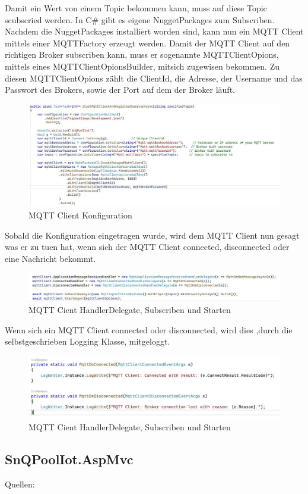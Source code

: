 Damit ein Wert von einem Topic bekommen kann, muss auf diese Topic scubscried werden.
In C\# gibt es eigene NuggetPackages zum Subscriben. Nachdem die NuggetPackages installiert worden sind,
kann nun ein MQTT Client mittels einer MQTTFactory erzeugt werden. Damit der MQTT Client auf den richtigen
Broker subscriben kann, muss er sogenannte MQTTClientOpions, mittels eines MQTTClientOpionsBuilder, mitsich zugewisen bekommen.
Zu diesen MQTTClientOpions zählt die ClientId, die Adresse, der Username und das Passwort des Brokers, sowie
der Port auf dem der Broker läuft.
\begin{figure}[H]
    \centering
    \includegraphics[width=1.3\textwidth]{pics/StartMqttClientConnections.JPG}  
    \caption{MQTT Client Konfiguration}
\end{figure}
Sobald die Konfiguration eingetragen wurde, wird dem MQTT Client nun gesagt was er zu tuen hat, 
wenn sich der MQTT Client connected, disconnected oder eine Nachricht bekommt.

\begin{figure}[H]
    \centering
    \includegraphics[width=1.3\textwidth]{pics/StartMqttClientCallMethods.JPG}  
    \caption{MQTT Cient HandlerDelegate, Subscriben und Starten}
\end{figure}

Wenn sich ein MQTT Client connected oder disconnected, wird dies 
,durch die selbstgeschrieben Logging Klasse, mitgeloggt.

\begin{figure}[H]
    \centering
    \includegraphics[width=1.1\textwidth]{pics/StartMqttClientConnectAndDisconnect.JPG}  
    \caption{MQTT Cient HandlerDelegate, Subscriben und Starten}
\end{figure}

\subsection{SnQPoolIot.AspMvc}

Quellen: 
